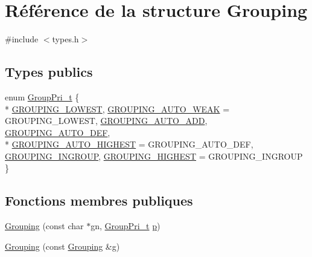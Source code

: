 \hypertarget{struct_grouping}{}\section{Référence de la structure Grouping}
\label{struct_grouping}


{\ttfamily \#include $<$types.\+h$>$}

\subsection*{Types publics}
\begin{DoxyCompactItemize}
\item 
enum \hyperlink{struct_grouping_a9f0ec5ab376b083ebe3274ea79fd2d70}{Group\+Pri\+\_\+t} \{ \\*
\hyperlink{struct_grouping_a9f0ec5ab376b083ebe3274ea79fd2d70a251075fcb0324e4f5f3d7bc8767ca06b}{G\+R\+O\+U\+P\+I\+N\+G\+\_\+\+L\+O\+W\+E\+S\+T}, 
\hyperlink{struct_grouping_a9f0ec5ab376b083ebe3274ea79fd2d70aa59227c8fa39faf56ebc4c06e08d4d84}{G\+R\+O\+U\+P\+I\+N\+G\+\_\+\+A\+U\+T\+O\+\_\+\+W\+E\+A\+K} = G\+R\+O\+U\+P\+I\+N\+G\+\_\+\+L\+O\+W\+E\+S\+T, 
\hyperlink{struct_grouping_a9f0ec5ab376b083ebe3274ea79fd2d70a44f89332beea02ebc5d56bcb71a081ba}{G\+R\+O\+U\+P\+I\+N\+G\+\_\+\+A\+U\+T\+O\+\_\+\+A\+D\+D}, 
\hyperlink{struct_grouping_a9f0ec5ab376b083ebe3274ea79fd2d70ab767fc9fe6f874c09362fd1350738f7f}{G\+R\+O\+U\+P\+I\+N\+G\+\_\+\+A\+U\+T\+O\+\_\+\+D\+E\+F}, 
\\*
\hyperlink{struct_grouping_a9f0ec5ab376b083ebe3274ea79fd2d70ab0dee71675bf90a137537784427e2956}{G\+R\+O\+U\+P\+I\+N\+G\+\_\+\+A\+U\+T\+O\+\_\+\+H\+I\+G\+H\+E\+S\+T} = G\+R\+O\+U\+P\+I\+N\+G\+\_\+\+A\+U\+T\+O\+\_\+\+D\+E\+F, 
\hyperlink{struct_grouping_a9f0ec5ab376b083ebe3274ea79fd2d70a464b2001acf04bed5df29c11a66fb2fb}{G\+R\+O\+U\+P\+I\+N\+G\+\_\+\+I\+N\+G\+R\+O\+U\+P}, 
\hyperlink{struct_grouping_a9f0ec5ab376b083ebe3274ea79fd2d70adca997c0931955d0ff0b9e23d14a9d2a}{G\+R\+O\+U\+P\+I\+N\+G\+\_\+\+H\+I\+G\+H\+E\+S\+T} = G\+R\+O\+U\+P\+I\+N\+G\+\_\+\+I\+N\+G\+R\+O\+U\+P
 \}
\end{DoxyCompactItemize}
\subsection*{Fonctions membres publiques}
\begin{DoxyCompactItemize}
\item 
\hyperlink{struct_grouping_a41b9c9ed04b5fa49a91a6e18e84d3576}{Grouping} (const char $\ast$gn, \hyperlink{struct_grouping_a9f0ec5ab376b083ebe3274ea79fd2d70}{Group\+Pri\+\_\+t} \hyperlink{060__command__switch_8tcl_a15229b450f26d8fa1c10bea4f3279f4d}{p})
\item 
\hyperlink{struct_grouping_ab8595b4b30745ff7b201e023b486ab67}{Grouping} (const \hyperlink{struct_grouping}{Grouping} \&\hyperlink{060__command__switch_8tcl_af08b4b5bfa9edf0b0a7dee1c2b2c29e0}{g})
\end{DoxyCompactItemize}

